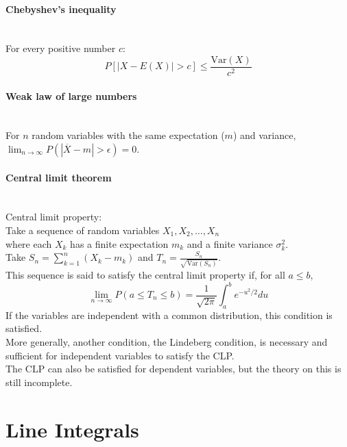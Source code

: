\documentclass[10pt]{article}
\begin{document}
\paragraph{Chebyshev's inequality}\ \\
For every positive number $c$:
\begin{equation*}P[|X-E(X)| > c] \leq \frac{\text{Var}(X)}{c^2}\end{equation*}

\paragraph{Weak law of large numbers}\ \\
For $n$ random variables with the same expectation ($m$) and variance, $\lim_{n\to\infty} P(|\overline{X}-m| > \epsilon) = 0$.

\paragraph{Central limit theorem}\ \\
Central limit property:\\
Take a sequence of random variables $X_1, X_2, \dotsc, X_n$\\
where each $X_k$ has a finite expectation $m_k$ and a finite variance $\sigma_k^2$.\\
Take $S_n = \sum_{k=1}^n (X_k - m_k)$ and $T_n = \frac{S_n}{\sqrt{\text{Var}(S_n)}}$.\\
This sequence is said to satisfy the central limit property if, for all $a \leq b$,
\begin{equation*}\lim_{n\to\infty}P(a\leq T_n\leq b)=\frac{1}{\sqrt{2\pi}}\int_a^b e^{-u^2/2}du\end{equation*}
If the variables are independent with a common distribution, this condition is satisfied.\\
More generally, another condition, the Lindeberg condition, is necessary and sufficient for independent variables to satisfy the CLP.\\
The CLP can also be satisfied for dependent variables, but the theory on this is still incomplete.



\bigskip\bigskip
\section{Line Integrals}\smallskip
\end{document}
